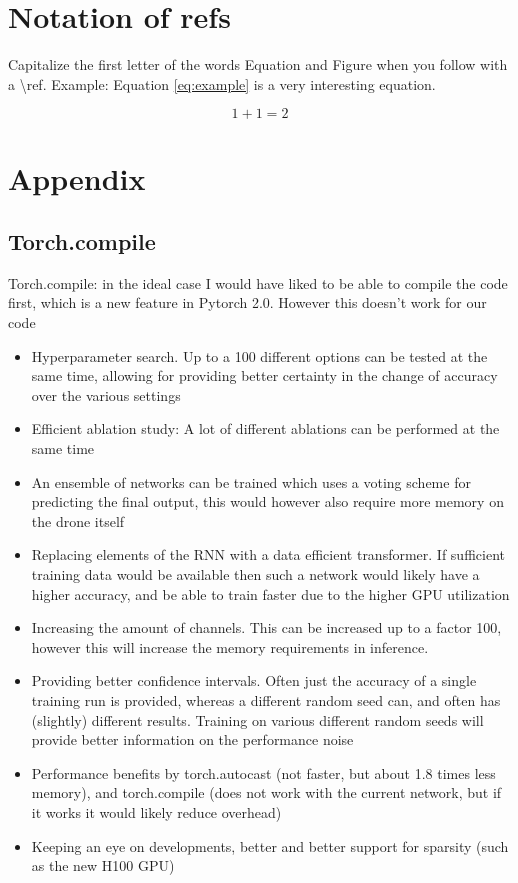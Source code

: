 \section*{Notation of refs}

Capitalize the first letter of the words Equation and Figure when you follow with a \textbackslash ref.
Example: Equation \ref{eq:example} is a very interesting equation.

\begin{equation}
	1 + 1 = 2
	\label{eq:example}
\end{equation}


\section{Appendix}

\subsection{Torch.compile}
Torch.compile: in the ideal case I would have liked to be able to compile the code first, which is a new feature in Pytorch 2.0. However this doesn't work for our code


\begin{itemize}
    \item Hyperparameter search. Up to a 100 different options can be tested at the same time, allowing for providing better certainty in the change of accuracy over the various settings
    \item Efficient ablation study: A lot of different ablations can be performed at the same time
    \item An ensemble of networks can be trained which uses a voting scheme for predicting the final output, this would however also require more memory on the drone itself
    \item Replacing elements of the RNN with a data efficient transformer. If sufficient training data would be available then such a network would likely have a higher accuracy, and be able to train faster due to the higher GPU utilization
    \item Increasing the amount of channels. This can be increased up to a factor 100, however this will increase the memory requirements in inference. 
    \item Providing better confidence intervals. Often just the accuracy of a single training run is provided, whereas a different random seed can, and often has (slightly) different results. Training on various different random seeds will provide better information on the performance noise 
    \item Performance benefits by torch.autocast (not faster, but about 1.8 times less memory), and torch.compile (does not work with the current network, but if it works it would likely reduce overhead) 
    \item Keeping an eye on developments, better and better support for sparsity (such as the new H100 GPU)
\end{itemize}



